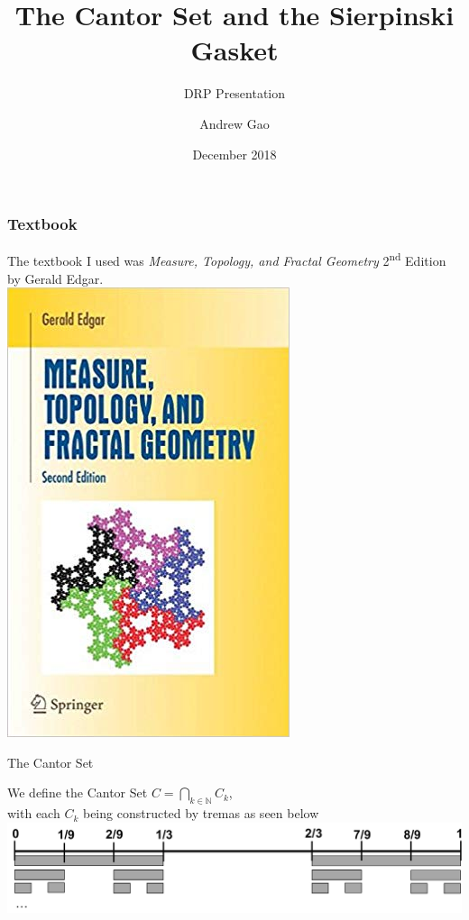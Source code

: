 \documentclass{beamer}
\title[Sierpinski Gasket]{The Cantor Set and the Sierpinski Gasket}
\subtitle{DRP Presentation}
\author{Andrew Gao}
\date{December 2018}
\begin{document}
\frame{\titlepage}
 
\begin{frame}
\frametitle{Textbook}
\begin{center}
The textbook I used was \textit{Measure, Topology, and Fractal Geometry} 2\textsuperscript{nd} Edition by Gerald Edgar.\\ \vspace{2em}
\includegraphics[scale=0.25]{mtfg.jpg}
\end{center}
\end{frame}
 
\begin{frame}{The Cantor Set}
\begin{center}
We define the Cantor Set $C = \bigcap_{k\in\mathbb{N}}C_{k}$,\\ with each $C_k$ being constructed by tremas as seen below\\ \vspace{2em}
\includegraphics[scale=0.4]{canto1.png}
\end{center}
\end{frame}
\end{document}
